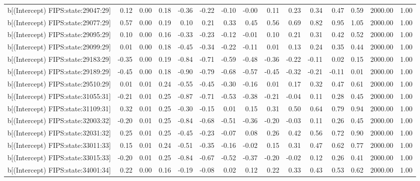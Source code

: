 \begin{table}[ht]
\begin{tabular}{rrrrrrrrrrrrrrr}
  b[(Intercept) FIPS:state:29047:29] & 0.12 & 0.00 & 0.18 & -0.36 & -0.22 & -0.10 & -0.00 & 0.11 & 0.23 & 0.34 & 0.47 & 0.59 & 2000.00 & 1.00 \\ 
  b[(Intercept) FIPS:state:29077:29] & 0.57 & 0.00 & 0.19 & 0.10 & 0.21 & 0.33 & 0.45 & 0.56 & 0.69 & 0.82 & 0.95 & 1.05 & 2000.00 & 1.00 \\ 
  b[(Intercept) FIPS:state:29095:29] & 0.10 & 0.00 & 0.16 & -0.33 & -0.23 & -0.12 & -0.01 & 0.10 & 0.21 & 0.31 & 0.42 & 0.52 & 2000.00 & 1.00 \\ 
  b[(Intercept) FIPS:state:29099:29] & 0.01 & 0.00 & 0.18 & -0.45 & -0.34 & -0.22 & -0.11 & 0.01 & 0.13 & 0.24 & 0.35 & 0.44 & 2000.00 & 1.00 \\ 
  b[(Intercept) FIPS:state:29183:29] & -0.35 & 0.00 & 0.19 & -0.84 & -0.71 & -0.59 & -0.48 & -0.36 & -0.22 & -0.11 & 0.02 & 0.15 & 2000.00 & 1.00 \\ 
  b[(Intercept) FIPS:state:29189:29] & -0.45 & 0.00 & 0.18 & -0.90 & -0.79 & -0.68 & -0.57 & -0.45 & -0.32 & -0.21 & -0.11 & 0.01 & 2000.00 & 1.00 \\ 
  b[(Intercept) FIPS:state:29510:29] & 0.01 & 0.01 & 0.24 & -0.55 & -0.45 & -0.30 & -0.16 & 0.01 & 0.17 & 0.32 & 0.47 & 0.61 & 2000.00 & 1.00 \\ 
  b[(Intercept) FIPS:state:31055:31] & -0.21 & 0.01 & 0.25 & -0.87 & -0.71 & -0.53 & -0.38 & -0.21 & -0.04 & 0.11 & 0.28 & 0.45 & 2000.00 & 1.00 \\ 
  b[(Intercept) FIPS:state:31109:31] & 0.32 & 0.01 & 0.25 & -0.30 & -0.15 & 0.01 & 0.15 & 0.31 & 0.50 & 0.64 & 0.79 & 0.94 & 2000.00 & 1.00 \\ 
  b[(Intercept) FIPS:state:32003:32] & -0.20 & 0.01 & 0.25 & -0.84 & -0.68 & -0.51 & -0.36 & -0.20 & -0.03 & 0.11 & 0.26 & 0.45 & 2000.00 & 1.00 \\ 
  b[(Intercept) FIPS:state:32031:32] & 0.25 & 0.01 & 0.25 & -0.45 & -0.23 & -0.07 & 0.08 & 0.26 & 0.42 & 0.56 & 0.72 & 0.90 & 2000.00 & 1.00 \\ 
  b[(Intercept) FIPS:state:33011:33] & 0.15 & 0.01 & 0.24 & -0.51 & -0.35 & -0.16 & -0.02 & 0.15 & 0.31 & 0.47 & 0.62 & 0.77 & 2000.00 & 1.00 \\ 
  b[(Intercept) FIPS:state:33015:33] & -0.20 & 0.01 & 0.25 & -0.84 & -0.67 & -0.52 & -0.37 & -0.20 & -0.02 & 0.12 & 0.26 & 0.41 & 2000.00 & 1.00 \\ 
  b[(Intercept) FIPS:state:34001:34] & 0.22 & 0.00 & 0.16 & -0.19 & -0.08 & 0.02 & 0.12 & 0.22 & 0.33 & 0.43 & 0.53 & 0.62 & 2000.00 & 1.00 \\ 

\end{tabular}
\end{table}
